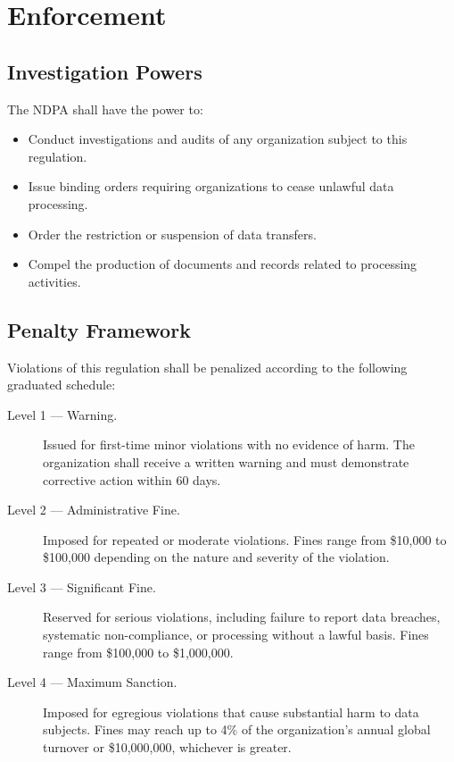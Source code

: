 \documentclass[
    language=english,
    doctype=article,
    institution=none,
]{../../omnilatex}
\begin{document}
\section{Enforcement}

\subsection{Investigation Powers}

The NDPA shall have the power to:

\begin{itemize}
    \item Conduct investigations and audits of any organization subject to
        this regulation.
    \item Issue binding orders requiring organizations to cease unlawful
        data processing.
    \item Order the restriction or suspension of data transfers.
    \item Compel the production of documents and records related to
        processing activities.
\end{itemize}

\subsection{Penalty Framework}

Violations of this regulation shall be penalized according to the
following graduated schedule:

\begin{description}
    \item[Level 1 --- Warning.] Issued for first-time minor violations
        with no evidence of harm. The organization shall receive a written
        warning and must demonstrate corrective action within 60 days.
    \item[Level 2 --- Administrative Fine.] Imposed for repeated or
        moderate violations. Fines range from \$10,000 to \$100,000
        depending on the nature and severity of the violation.
    \item[Level 3 --- Significant Fine.] Reserved for serious violations,
        including failure to report data breaches, systematic non-compliance,
        or processing without a lawful basis. Fines range from \$100,000
        to \$1,000,000.
    \item[Level 4 --- Maximum Sanction.] Imposed for egregious violations
        that cause substantial harm to data subjects. Fines may reach up
        to 4\% of the organization's annual global turnover or
        \$10,000,000, whichever is greater.
\end{description}
\end{document}
